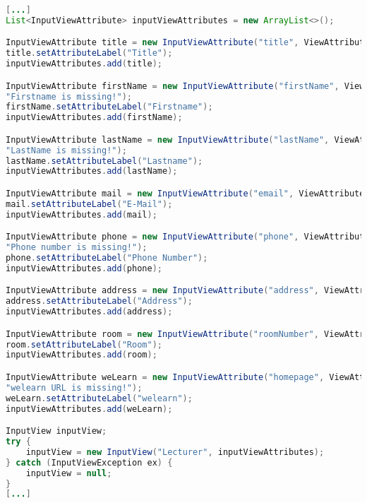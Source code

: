 \begin{lstlisting}[label=lst:inputview_impl,
language=java,
firstnumber=1,
caption=Erstellung einer \textit{InputView}.]				   
[...]
List<InputViewAttribute> inputViewAttributes = new ArrayList<>();

InputViewAttribute title = new InputViewAttribute("title", ViewAttribute.AttributeType.TEXT, "Title", "Title is missing!");
title.setAttributeLabel("Title");
inputViewAttributes.add(title);

InputViewAttribute firstName = new InputViewAttribute("firstName", ViewAttribute.AttributeType.TEXT, "FirstName",
"Firstname is missing!");
firstName.setAttributeLabel("Firstname");
inputViewAttributes.add(firstName);

InputViewAttribute lastName = new InputViewAttribute("lastName", ViewAttribute.AttributeType.TEXT, "Lastname",
"LastName is missing!");
lastName.setAttributeLabel("Lastname");
inputViewAttributes.add(lastName);

InputViewAttribute mail = new InputViewAttribute("email", ViewAttribute.AttributeType.MAIL, "E-Mail", "E-Mail is missing!");
mail.setAttributeLabel("E-Mail");
inputViewAttributes.add(mail);

InputViewAttribute phone = new InputViewAttribute("phone", ViewAttribute.AttributeType.PHONE_NUMBER, "Phone Number",
"Phone number is missing!");
phone.setAttributeLabel("Phone Number");
inputViewAttributes.add(phone);

InputViewAttribute address = new InputViewAttribute("address", ViewAttribute.AttributeType.TEXT, "Address", "Address is missing!");
address.setAttributeLabel("Address");
inputViewAttributes.add(address);

InputViewAttribute room = new InputViewAttribute("roomNumber", ViewAttribute.AttributeType.TEXT, "Room", "Room is missing!");
room.setAttributeLabel("Room");
inputViewAttributes.add(room);

InputViewAttribute weLearn = new InputViewAttribute("homepage", ViewAttribute.AttributeType.URL, "welearn",
"welearn URL is missing!");
weLearn.setAttributeLabel("welearn");
inputViewAttributes.add(weLearn);

InputView inputView;
try {
	inputView = new InputView("Lecturer", inputViewAttributes);
} catch (InputViewException ex) {
	inputView = null;
}
[...]
\end{lstlisting}

\newpage

